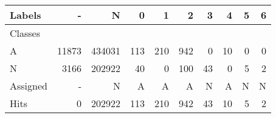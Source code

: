 \begin{tabular}{l|r|r|r|r|r|r|r|r|r}

Labels &      - &       N &    0 &    1 &    2 &   3 &   4 &  5 &  6 \\\hline
Classes  &        &         &      &      &      &     &     &    &    \\\hline
\hline
A        &  11873 &  434031 &  113 &  210 &  942 &   0 &  10 &  0 &  0 \\\hline
N        &   3166 &  202922 &   40 &    0 &  100 &  43 &   0 &  5 &  2 \\\hline
\hline
Assigned &      - &       N &    A &    A &    A &   N &   A &  N &  N \\\hline
Hits     &      0 &  202922 &  113 &  210 &  942 &  43 &  10 &  5 &  2 
\end{tabular}
